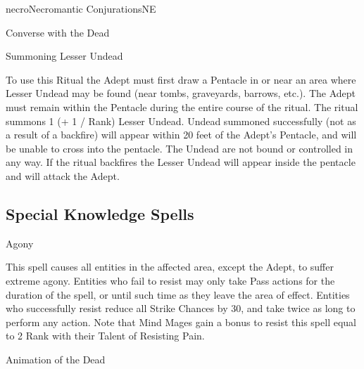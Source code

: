 \begin{college}[1.1]{necro}{Necromantic Conjurations}{NE}
\begin{ritual}[Q-1]{Converse with the Dead}
\begin{effects}
\end{effects}
\end{ritual}

\begin{ritual}[Q-2]{Summoning Lesser Undead}

\begin{effects}
To use this Ritual the Adept must first draw a Pentacle in or near an
area where Lesser Undead may be found (near tombs, graveyards,
barrows, etc.).  The Adept must remain within the Pentacle during the
entire course of the ritual.  The ritual summons 1 (+ 1 / Rank) Lesser
Undead.  Undead summoned successfully (\ie not as a result of a
backfire) will appear within 20 feet of the Adept's Pentacle, and will
be unable to cross into the pentacle.  The Undead are not bound or
controlled in any way.  If the ritual backfires the Lesser Undead
will appear inside the pentacle and will attack the Adept.
\end{effects}
\end{ritual}

\subsection{Special Knowledge Spells}

\begin{spell}[S-1]{Agony}

\begin{effects}
This spell causes all entities in the affected area, except the Adept,
to suffer extreme agony.  Entities who fail to resist may only take
Pass actions for the duration of the spell, or until such time as they
leave the area of effect.  Entities who successfully resist reduce all
Strike Chances by 30, and take twice as long to perform any action.
Note that Mind Mages gain a bonus to resist this spell equal to 2 \x
Rank with their Talent of Resisting Pain.
\end{effects}
\end{spell}

\begin{spell}[S-2]{Animation of the Dead}


\end{spell}
\end{college}
